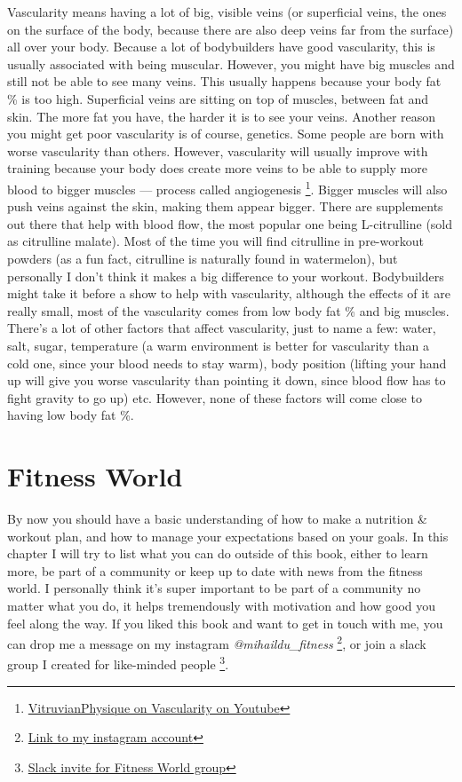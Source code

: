 \documentclass[openany, 12pt]{book}
\begin{document}
        Vascularity means having a lot of big, visible veins (or superficial veins, the ones on the surface of the body, because there are also deep veins far from the surface) all over your body.
        Because a lot of bodybuilders have good vascularity, this is usually associated with being muscular. However, you might have big muscles and still not be able to see many veins. This usually
        happens because your body fat \% is too high. Superficial veins are sitting on top of muscles, between fat and skin. The more fat you have, the harder it is to see your veins.
        Another reason you might get poor vascularity is of course, genetics. Some people are born with worse vascularity than others. However, vascularity will usually improve with training
        because your body does create more veins to be able to supply more blood to bigger muscles --- process called angiogenesis
        \footnote{\href{https://www.youtube.com/watch?v=N1oCJiw8oTY}{VitruvianPhysique on Vascularity on Youtube}}. Bigger muscles will also push veins against the skin, making them appear bigger.
        There are supplements out there that help with blood flow, the most popular one being L-citrulline (sold as citrulline malate). Most of the time you will find citrulline in pre-workout
        powders (as a fun fact, citrulline is naturally found in watermelon), but personally I don't think it makes a big difference to your workout. Bodybuilders might take it before a show
        to help with vascularity, although the effects of it are really small, most of the vascularity comes from low body fat \% and big muscles.
        There's a lot of other factors that affect vascularity, just to name a few:
        water, salt, sugar, temperature (a warm environment is better for vascularity than a cold one, since your blood needs to stay warm), body position (lifting your hand up will give you worse
        vascularity than pointing it down, since blood flow has to fight gravity to go up) etc. However, none of these factors will come close to having low body fat \%.

  \chapter{Fitness World}

  By now you should have a basic understanding of how to make a nutrition \& workout plan, and how to manage your expectations based on your goals. In this chapter I will try to
  list what you can do outside of this book, either to learn more, be part of a community or keep up to date with news from the fitness world. I personally think it's super important
  to be part of a community no matter what you do, it helps tremendously with motivation and how good you feel along the way. If you liked this book and want to get in touch with me,
  you can drop me a message on my instagram \textit{@mihaildu\_fitness}
  \footnote{\href{https://www.instagram.com/mihaildu_fitness/}{Link to my instagram account}}, or join a slack group I created for like-minded people
  \footnote{\href{https://join.slack.com/t/fitness-world-group/shared_invite/zt-1bhw1fakw-X5vr_m1DwEv2tAelIcWj1w}{Slack invite for Fitness World group}}.
\end{document}
